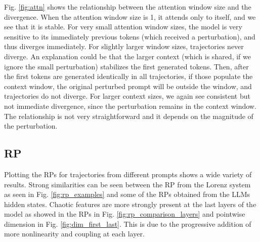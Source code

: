 \documentclass[a4paper,12pt]{article}
\begin{document}
    Fig. \ref{fig:attn} shows the relationship between the attention window size and the divergence. When the attention window size is 1, it attends only to itself, and we see that it is stable.
    For very small attention window sizes, the model is very sensitive to its immediately previous tokens (which received a perturbation), and thus diverges immediately. For slightly larger window sizes, trajectories never diverge. An explanation could be that the larger context (which is shared, if we ignore the small perturbation) stabilizes the first generated tokens. Then, after the first tokens are generated identically in all trajectories, if those populate the context window, the original perturbed prompt will be outside the window, and trajectories do not diverge. For larger context sizes, we again see consistent but not immediate divergence, since the perturbation remains in the context window.
    The relationship is not very straightforward and it depends on the magnitude of the perturbation. 



    \subsection{RP}
    \label{subsec:rp_results}

    Plotting the RPs for trajectories from different prompts shows a wide variety of results. Strong similarities can be seen between the RP from the Lorenz \cite{DeterministicNonperiodicFlow} system as seen in Fig. \ref{fig:rp_examples} and some of the RPs obtained from the LLMs hidden states. Chaotic features are more strongly present at the last layers of the model as showed in the RPs in Fig. \ref{fig:rp_comparison_layers} and pointwise dimension in Fig. \ref{fig:dim_first_last}. This is due to the progressive addition of more nonlinearity and coupling at each layer. 
\end{document}
